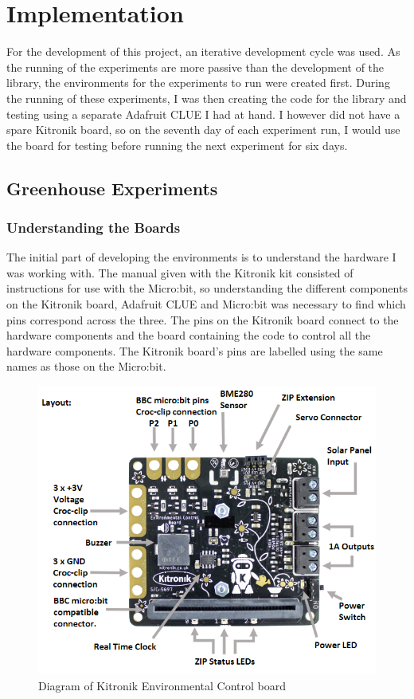 \chapter{Implementation}

For the development of this project, an iterative development cycle was used. As the running of the experiments are more passive than the development of the library, the environments for the experiments to run were created first. During the running of these experiments, I was then creating the code for the library and testing using a separate Adafruit CLUE I had at hand. I however did not have a spare Kitronik board, so on the seventh day of each experiment run, I would use the board for testing before running the next experiment for six days.

\section{Greenhouse Experiments}

\subsection{Understanding the Boards}

The initial part of developing the environments is to understand the hardware I was working with. The manual given with the Kitronik kit consisted of instructions for use with the Micro:bit, so understanding the different components on the Kitronik board, Adafruit CLUE and Micro:bit was necessary to find which pins correspond across the three. The pins on the Kitronik board connect to the hardware components and the board containing the code to control all the hardware components. The Kitronik board's pins are labelled using the same names as those on the Micro:bit.

\begin{figure}[H]
    \includegraphics[scale=0.7]{Report/Images/KitronikBoardDiagram.png}
    \caption{Diagram of Kitronik Environmental Control board \cite{kitronikBoard}}
    \label{fig:KitronikDiagram}
\end{figure}

